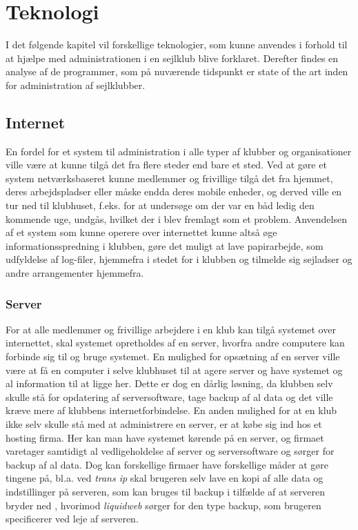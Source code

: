 \chapter{Teknologi}\label{chap:teknologi-analyse}

I det følgende kapitel vil forskellige teknologier, som kunne anvendes i forhold til at hjælpe med administrationen i en
sejlklub blive forklaret. Derefter findes en analyse af de programmer, som på nuværende tidspunkt er state of the art
inden for administration af sejlklubber.


\section{Internet}
En fordel for et system til administration i alle typer af klubber og organisationer ville være at kunne tilgå det fra
flere steder end bare et sted. Ved at gøre et system netværksbaseret kunne medlemmer og frivillige tilgå det fra hjemmet, 
deres arbejdspladser eller måske endda deres mobile enheder, 
og derved ville en tur ned til klubhuset, f.eks. for at undersøge om der var en båd ledig den
kommende uge, undgås, hvilket der i  blev fremlagt som et problem. Anvendelsen
af et system som kunne operere over internettet kunne altså øge informationsspredning i klubben, gøre det muligt at lave
papirarbejde, som udfyldelse af log-filer, hjemmefra i stedet for i klubben og tilmelde sig sejladser og andre arrangementer
hjemmefra. 


\subsection*{Server}

For at alle medlemmer og frivillige arbejdere i en klub kan tilgå systemet over internettet, skal systemet opretholdes
af en server, hvorfra andre computere kan forbinde sig til og bruge systemet. En mulighed for opsætning af en server
ville være at få en computer i selve klubhuset til at agere server og have systemet og al information til at ligge her.
Dette er dog en dårlig løsning, da klubben selv skulle stå for opdatering af serversoftware, tage backup af al data og
det ville kræve mere af klubbens internetforbindelse. En anden mulighed for at en klub ikke selv skulle stå med at
administrere en server, er at købe sig ind hos et hosting firma. Her kan man have systemet kørende på en server, og firmaet
varetager samtidigt al vedligeholdelse af server og serversoftware og sørger for backup af al data. Dog kan forskellige
firmaer have forskellige måder at gøre tingene på, bl.a. ved \textit{trans ip} skal brugeren selv lave en kopi af alle
data og indstillinger på serveren, som kan bruges til backup i tilfælde af at serveren bryder ned \citep{Virtuelserver},
hvorimod \textit{liquidweb} \citep{liquid} sørger for den type backup, som brugeren specificerer ved leje af serveren.

